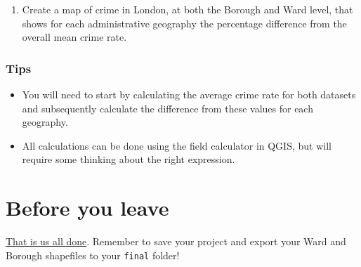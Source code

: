 \documentclass[
]{book}
\providecommand{\tightlist}{%
  \setlength{\itemsep}{0pt}\setlength{\parskip}{0pt}}
\begin{document}
\begin{enumerate}
\def\labelenumi{\arabic{enumi}.}
\setcounter{enumi}{1}
\tightlist
\item
  Create a map of crime in London, at both the Borough and Ward level, that shows for each administrative geography the percentage difference from the overall mean crime rate.
\end{enumerate}

\hypertarget{tips-1}{%
\subsubsection*{Tips}\label{tips-1}}

\begin{itemize}
\tightlist
\item
  You will need to start by calculating the average crime rate for both datasets and subsequently calculate the difference from these values for each geography.
\item
  All calculations can be done using the field calculator in QGIS, but will require some thinking about the right expression.
\end{itemize}

\hypertarget{byl-w03}{%
\section{Before you leave}\label{byl-w03}}

\href{https://www.youtube.com/watch?v=3wxyN3z9PL4}{That is us all done}. Remember to save your project and export your Ward and Borough shapefiles to your \texttt{final} folder!
\end{document}
